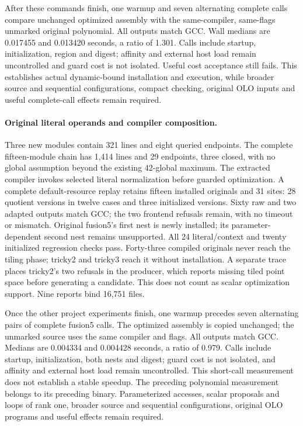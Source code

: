After these commands finish, one warmup and seven alternating complete calls
compare unchanged optimized assembly with the same-compiler, same-flags
unmarked original polynomial. All outputs match GCC. Wall medians are 0.017455
and 0.013420 seconds, a ratio of 1.301. Calls include startup, initialization,
region and digest; affinity and external host load remain uncontrolled and
guard cost is not isolated. Useful cost acceptance still fails. This establishes
actual dynamic-bound installation and execution, while broader source and
sequential configurations, compact checking, original OLO inputs and useful
complete-call effects remain required.

\paragraph{Original literal operands and compiler composition.}
Three new modules contain 321 lines and eight queried endpoints. The complete
fifteen-module chain has 1,414 lines and 29 endpoints, three closed, with no
global assumption beyond the existing 42-global maximum. The extracted
compiler invokes selected literal normalization before guarded optimization.
A complete default-resource replay retains fifteen installed originals and
31 sites: 28 quotient versions in twelve cases and three initialized versions.
Sixty raw and two adapted outputs match GCC; the two frontend refusals remain,
with no timeout or mismatch. Original fusion5's first nest is newly installed;
its parameter-dependent second nest remains unsupported. All 24 literal/context
and twenty initialized regression checks pass. Forty-three compiled originals
never reach the tiling phase; tricky2 and tricky3 reach it without installation.
A separate trace places tricky2's two refusals in the producer, which reports
missing tiled point space before generating a candidate. This does not count
as scalar optimization support. Nine reports bind 16,751 files.

Once the other project experiments finish, one warmup precedes seven alternating
pairs of complete fusion5 calls. The optimized assembly is copied unchanged;
the unmarked source uses the same compiler and flags. All outputs match GCC.
Medians are 0.004334 and
0.004428 seconds, a ratio of 0.979. Calls include startup, initialization, both
nests and digest; guard cost is not isolated, and affinity and external host
load remain uncontrolled. This short-call measurement does not establish a
stable speedup. The preceding polynomial measurement belongs to its preceding
binary. Parameterized accesses, scalar proposals and loops of rank one, broader source and
sequential configurations, original OLO programs and useful effects remain
required.

